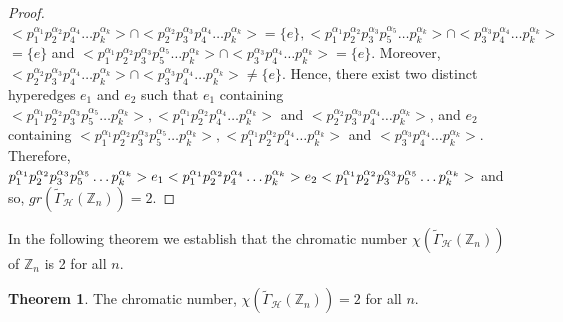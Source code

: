 \documentclass[11pt,a4paper]{article}
\theoremstyle{definition}
\newtheorem{theorem}{Theorem}[section]
\theoremstyle{remark}
\begin{document}
\begin{proof}
$ <p_1^{\alpha_1}p_2^{\alpha_2}p_4^{\alpha_4}\ldots p_k^{\alpha_k}> \cap <p_2^{\alpha_2}p_3^{\alpha_3}p_4^{\alpha_4}\ldots p_k^{\alpha_k}>=\{e\}, <p_1^{\alpha_1}p_2^{\alpha_2}p_3^{\alpha_3}p_5^{\alpha_5}\ldots p_k^{\alpha_k}> \cap <p_3^{\alpha_3}p_4^{\alpha_4}\ldots p_k^{\alpha_k}>$ \\$ =\{e\}$ and $<p_1^{\alpha_1}p_2^{\alpha_2}p_3^{\alpha_3}p_5^{\alpha_5}\ldots p_k^{\alpha_k}> \cap <p_3^{\alpha_3}p_4^{\alpha_4}\ldots p_k^{\alpha_k}>=\{e\}$. Moreover, $<p_2^{\alpha_2}p_3^{\alpha_3}p_4^{\alpha_4}\ldots p_k^{\alpha_k}> \cap <p_3^{\alpha_3}p_4^{\alpha_4}\ldots p_k^{\alpha_k}> \neq \{e\}$. Hence, there exist two distinct hyperedges $e_1$ and $e_2$ such that $e_1$ containing $<p_1^{\alpha_1}p_2^{\alpha_2}p_3^{\alpha_3}p_5^{\alpha_5}\ldots p_k^{\alpha_k}>, <p_1^{\alpha_1}p_2^{\alpha_2}p_4^{\alpha_4}\ldots p_k^{\alpha_k}>$ and $<p_2^{\alpha_2}p_3^{\alpha_3}p_4^{\alpha_4}\ldots p_k^{\alpha_k}>$, and $e_2$ containing $<p_1^{\alpha_1}p_2^{\alpha_2}p_3^{\alpha_3}p_5^{\alpha_5}\ldots p_k^{\alpha_k}>, <p_1^{\alpha_1}p_2^{\alpha_2}p_4^{\alpha_4}\ldots p_k^{\alpha_k}>$ and  $<p_3^{\alpha_3}p_4^{\alpha_4}\ldots p_k^{\alpha_k}>$. Therefore, $p_1^{\alpha_1}p_2^{\alpha_2}p_3^{\alpha_3}p_5^{\alpha_5}\ldots p_k^{\alpha_k}> e_1 <p_1^{\alpha_1}p_2^{\alpha_2}p_4^{\alpha_4}\ldots p_k^{\alpha_k}> e_2 \\ <p_1^{\alpha_1}p_2^{\alpha_2}p_3^{\alpha_3}p_5^{\alpha_5}\ldots p_k^{\alpha_k}>$ and so, $gr(\tilde{\Gamma}_\mathcal{H}(\mathbb{Z}_n))=2$. 
	\end{proof}
	In the following theorem we establish that the chromatic number $\chi(\tilde{\Gamma}_\mathcal{H}(\mathbb{Z}_n))$ of $\mathbb{Z}_n$ is 2 for all $n$.
	\begin{theorem}
		The chromatic number, $\chi(\tilde{\Gamma}_\mathcal{H}(\mathbb{Z}_n))=2$ for all $n$.
	\end{theorem}
\end{document}
